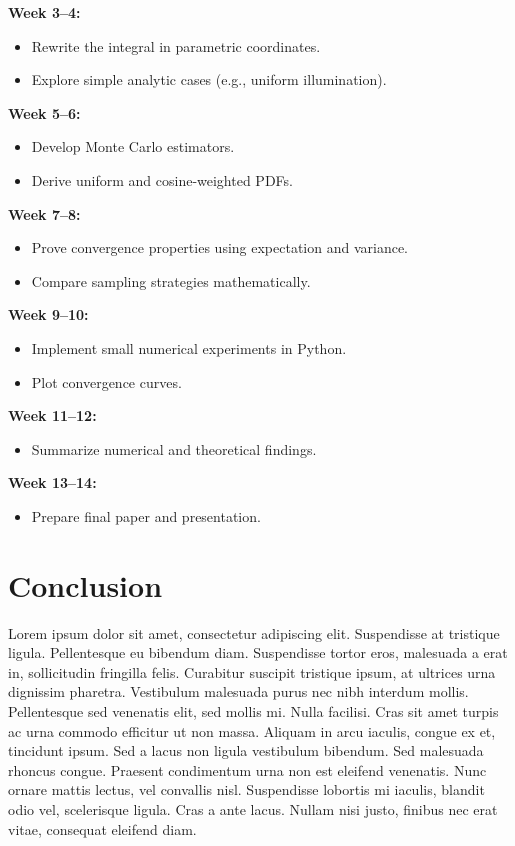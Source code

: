 \documentclass[12pt]{article}
\begin{document}
\textbf{Week 3–4:}
\begin{itemize}
    \item Rewrite the integral in parametric coordinates.
    \item Explore simple analytic cases (e.g., uniform illumination).
\end{itemize}

\textbf{Week 5–6:}
\begin{itemize}
    \item Develop Monte Carlo estimators.
    \item Derive uniform and cosine-weighted PDFs.
\end{itemize}

\textbf{Week 7–8:}
\begin{itemize}
    \item Prove convergence properties using expectation and variance.
    \item Compare sampling strategies mathematically.
\end{itemize}


\textbf{Week 9–10:}
\begin{itemize}
    \item Implement small numerical experiments in Python.
    \item Plot convergence curves.
\end{itemize}

\textbf{Week 11–12:}
\begin{itemize}
    \item Summarize numerical and theoretical findings.
\end{itemize}

\textbf{Week 13–14:}
\begin{itemize}
    \item Prepare final paper and presentation.
\end{itemize}

\section{Conclusion}
Lorem ipsum dolor sit amet, consectetur adipiscing elit. Suspendisse at tristique
ligula. Pellentesque eu bibendum diam. Suspendisse tortor eros, malesuada a erat in,
sollicitudin fringilla felis. Curabitur suscipit tristique ipsum, at ultrices urna dignissim
pharetra. Vestibulum malesuada purus nec nibh interdum mollis. Pellentesque sed
venenatis elit, sed mollis mi. Nulla facilisi. Cras sit amet turpis ac urna commodo
efficitur ut non massa. Aliquam in arcu iaculis, congue ex et, tincidunt ipsum. Sed
a lacus non ligula vestibulum bibendum. Sed malesuada rhoncus congue. Praesent
condimentum urna non est eleifend venenatis. Nunc ornare mattis lectus, vel convallis
nisl. Suspendisse lobortis mi iaculis, blandit odio vel, scelerisque ligula. Cras a ante
lacus. Nullam nisi justo, finibus nec erat vitae, consequat eleifend diam.
\end{document}
